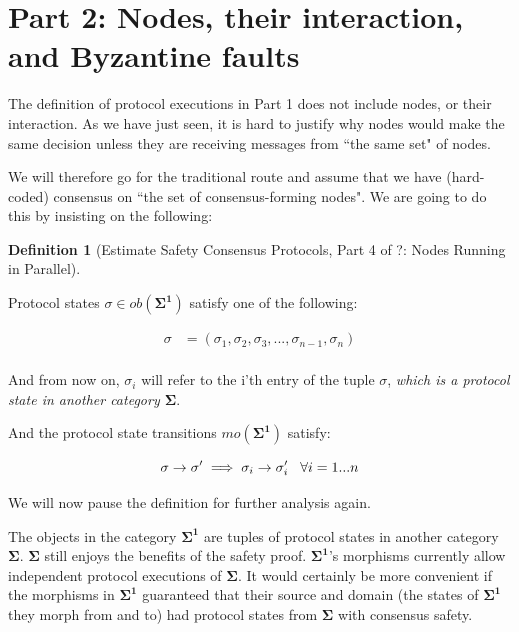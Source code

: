 \documentclass{article}
\theoremstyle{definition}
\newtheorem{defn}{Definition}[section]
\newcommand{\cat}{
	\mathbf
}
\begin{document}
\section{Part 2: Nodes, their interaction, and Byzantine faults}

The definition of protocol executions in Part 1 does not include nodes, or their interaction. As we have just seen, it is hard to justify why nodes would make the same decision unless they are receiving messages from ``the same set" of nodes.

We will therefore go for the traditional route and assume that we have (hard-coded) consensus on ``the set of consensus-forming nodes". We are going to do this by insisting on the following:

\begin{defn}[Estimate Safety Consensus Protocols, Part 4 of ?: Nodes Running in Parallel]
\begin{description}

Protocol states $\sigma \in ob(\cat{\Sigma^1})$ satisfy one of the following:

\begin{align*}
  \sigma &= (\sigma_1,\sigma_2,\sigma_3,...,\sigma_{n-1},\sigma_n)\\
\end{align*}

And from now on, $\sigma_i$ will refer to the i'th entry of the tuple $\sigma$, \emph{which is a protocol state in another category $\cat{\Sigma}$}.

And the protocol state transitions $mo(\cat{\Sigma^1})$ satisfy:

$$
\sigma \to \sigma' \implies \sigma_i \to \sigma'_i \hspace{3mm} \forall i=1...n
$$

We will now pause the definition for further analysis again.

\end{description}
\end{defn}

The objects in the category $\cat{\Sigma^1}$ are tuples of protocol states in another category $\cat{\Sigma}$. $\cat{\Sigma}$ still enjoys the benefits of the safety proof. $\cat{\Sigma^1}$'s morphisms currently allow independent protocol executions of $\cat{\Sigma}$. It would certainly be more convenient if the morphisms in $\cat{\Sigma^1}$ guaranteed that their source and domain (the states of $\cat{\Sigma^1}$ they morph from and to) had protocol states from $\cat{\Sigma}$ with consensus safety.
\end{document}
